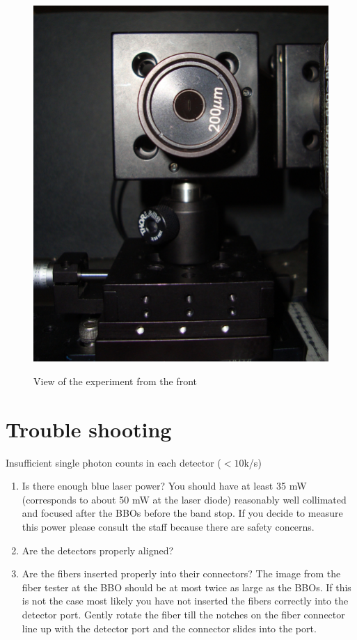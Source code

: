 \documentclass{../lab}
\begin{document}
\begin{figure}[H]
  \href{http://experimentationlab.berkeley.edu/sites/default/files/images/Qe_slit.jpeg}{\includegraphics[width=\linewidth,keepaspectratio]{images/Qe_slit.jpeg}}\caption{View of the experiment from the front}
  \label{fig:Qe_slit.jpeg}
\endminipage
\end{figure}

\noindent


\section{Trouble shooting}

Insufficient single photon counts in each detector ($<10$k/s)

\begin{enumerate}
    \item Is there enough blue laser power? You should have at least 35 mW (corresponds to about 50 mW at the laser diode) reasonably well collimated and focused after the BBOs before the band stop. If you decide to measure this power please consult the staff because there are safety concerns.

    \item Are the detectors properly aligned?

    \item Are the fibers inserted properly into their connectors? The image from the fiber tester at the BBO should be at most twice as large as the BBOs. If this is not the case most likely you have not inserted the fibers correctly into the detector port. Gently rotate the fiber till the notches on the fiber connector line up with the detector port and the connector slides into the port.
\end{enumerate}
\end{document}
